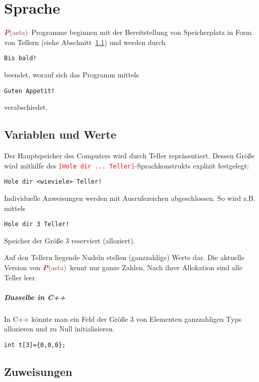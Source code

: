 \documentclass[11pt]{book}
\newcommand{\refsec}[1]{Abschnitt~\ref{#1}}
\newcommand{\Pasta}{\textcolor{brown}{{\bf \em P}{\scriptsize{(asta)}}}}
\begin{document}
\tableofcontents

\lstset{basicstyle=\normalsize,frame=none}

\chapter{Sprache}

\Pasta\ Programme beginnen mit der Bereitstellung von
Speicherplatz in Form von Tellern (siehe \refsec{sec:vars})
und werden durch
\color{red}
\begin{lstlisting}
Bis bald!
\end{lstlisting}
\color{black}
beendet, worauf sich das Programm mittels 
\color{purple}
\begin{lstlisting}
Guten Appetit!
\end{lstlisting}
\color{black}
verabschiedet.

\section{Variablen und Werte} \label{sec:vars}

Der Hauptspeicher des Computers wird durch Teller repr\"asentiert. 
Dessen Gr\"o\ss e wird mithilfe des
\textcolor{red}{\lstinline{[Hole dir ... Teller]}}-Sprachkonstrukts
explizit festgelegt: 
\color{red}
\begin{lstlisting}
Hole dir <wieviele> Teller!
\end{lstlisting}
\color{black}
Individuelle Anweisungen werden mit Ausrufezeichen abgeschlossen.
So wird z.B. mittels
\color{blue}
\begin{lstlisting}
Hole dir 3 Teller!
\end{lstlisting}
\color{black}
Speicher der Gr\"o\ss e 3 reserviert (alloziert). 

Auf den Tellern liegende Nudeln stellen (ganzzahlige) Werte dar.
Die aktuelle Version von \Pasta\ kennt nur ganze Zahlen.
Nach ihrer Allokation sind alle Teller leer.

\paragraph{Dasselbe in C++}
In C++ k\"onnte man ein Feld der Gr\"o\ss e 3 von Elementen ganzzahligen Typs allozieren und zu Null initialisieren.
\begin{lstlisting}
int t[3]={0,0,0};
\end{lstlisting}

\section{Zuweisungen}
\end{document}

